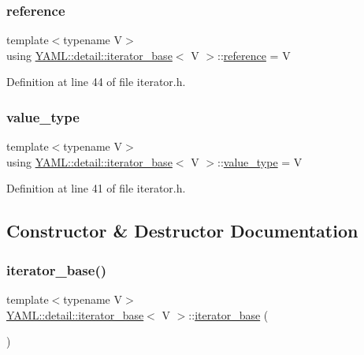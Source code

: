 \subsubsection{\texorpdfstring{reference}{reference}}
{\footnotesize\ttfamily template$<$typename V$>$ \\
using \mbox{\hyperlink{class_y_a_m_l_1_1detail_1_1iterator__base}{Y\+A\+M\+L\+::detail\+::iterator\+\_\+base}}$<$ V $>$\+::\mbox{\hyperlink{class_y_a_m_l_1_1detail_1_1iterator__base_aed8b6adc6449894e1e66bb81a75a4ca0}{reference}} =  V}



Definition at line 44 of file iterator.\+h.

\mbox{\label{class_y_a_m_l_1_1detail_1_1iterator__base_a21987ede08ffbfacc0e3caa39e66cb00}} 
\subsubsection{\texorpdfstring{value\_type}{value\_type}}
{\footnotesize\ttfamily template$<$typename V$>$ \\
using \mbox{\hyperlink{class_y_a_m_l_1_1detail_1_1iterator__base}{Y\+A\+M\+L\+::detail\+::iterator\+\_\+base}}$<$ V $>$\+::\mbox{\hyperlink{class_y_a_m_l_1_1detail_1_1iterator__base_a21987ede08ffbfacc0e3caa39e66cb00}{value\+\_\+type}} =  V}



Definition at line 41 of file iterator.\+h.



\subsection{Constructor \& Destructor Documentation}
\mbox{\label{class_y_a_m_l_1_1detail_1_1iterator__base_a89914fa0e9b850871d87944c5c34482c}} 
\subsubsection{\texorpdfstring{iterator\_base()}{iterator\_base()}\hspace{0.1cm}{\footnotesize\ttfamily [1/3]}}
{\footnotesize\ttfamily template$<$typename V$>$ \\
\mbox{\hyperlink{class_y_a_m_l_1_1detail_1_1iterator__base}{Y\+A\+M\+L\+::detail\+::iterator\+\_\+base}}$<$ V $>$\+::\mbox{\hyperlink{class_y_a_m_l_1_1detail_1_1iterator__base}{iterator\+\_\+base}} (\begin{DoxyParamCaption}{ }\end{DoxyParamCaption})\hspace{0.3cm}{\ttfamily [inline]}}



